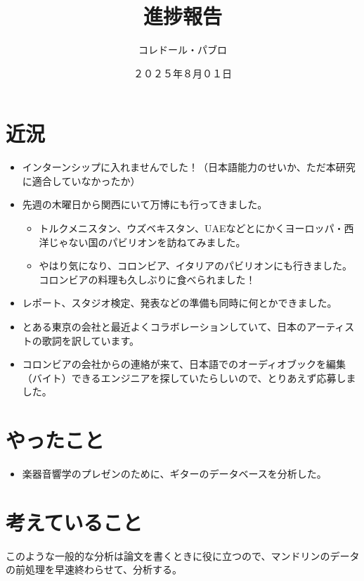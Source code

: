 \documentclass[a4paper, 12pt]{article}
\title{進捗報告}
\author{コレドール・パブロ}
\date{２０２５年８月０１日}
\begin{document}
\maketitle

\section*{近況}
\begin{itemize}
    \item インターンシップに入れませんでした！（日本語能力のせいか、ただ本研究に適合していなかったか）
    \item 先週の木曜日から関西にいて万博にも行ってきました。
    \begin{itemize}
        \item トルクメニスタン、ウズベキスタン、UAEなどとにかくヨーロッパ・西洋じゃない国のパビリオンを訪ねてみました。
        \item やはり気になり、コロンビア、イタリアのパビリオンにも行きました。コロンビアの料理も久しぶりに食べられました！
    \end{itemize}
    \item レポート、スタジオ検定、発表などの準備も同時に何とかできました。
    \item とある東京の会社と最近よくコラボレーションしていて、日本のアーティストの歌詞を訳しています。
    \item コロンビアの会社からの連絡が来て、日本語でのオーディオブックを編集（バイト）できるエンジニアを探していたらしいので、とりあえず応募しました。
\end{itemize} 

\section*{やったこと}
\begin{itemize}
    \item 楽器音響学のプレゼンのために、ギターのデータベースを分析した。
\end{itemize}

\section*{考えていること}

このような一般的な分析は論文を書くときに役に立つので、マンドリンのデータの前処理を早速終わらせて、分析する。

\end{document}
